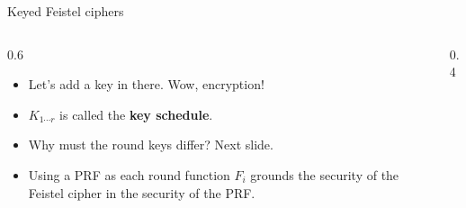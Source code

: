 \ifdefined\PRESENTATION\else\PassOptionsToClass{handout}{beamer}\fi\documentclass[aspectratio=169, lualatex]{beamer}
\begin{document}
\begin{frame}{Keyed Feistel ciphers}
	\begin{columns}[c]
		\begin{column}{0.6\textwidth}
			\begin{itemize}
				\item Let's add a key in there. Wow, encryption!
				\item $K_{1\cdots r}$ is called the \textbf{key schedule}.
				\item Why must the round keys differ? Next slide.
				\item Using a PRF as each round function $F_i$ grounds the security of the Feistel cipher in the security of the PRF.
			\end{itemize}
		\end{column}
		\begin{column}{0.4\textwidth}
			\begin{center}
			\end{center}
		\end{column}
	\end{columns}
\end{frame}
\end{document}
